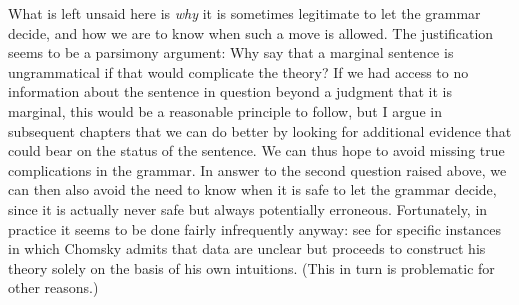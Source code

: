 \noindent
What is left unsaid here is \textit{why} it is sometimes legitimate to let the grammar decide, and how we are to know when such a move is allowed. The justification seems to be a parsimony argument: Why say that a marginal sentence is ungrammatical if that would complicate the theory? If we had access to no information about the sentence in question beyond a judgment that it is marginal, this would be a reasonable principle to follow, but I argue in subsequent chapters that we can do better by looking for additional evidence that could bear on the status of the sentence. We can thus hope to avoid missing true complications in the grammar. In answer to the second question raised above, we can then also avoid the need to know when it is safe to let the grammar decide, since it is actually never safe but
always potentially erroneous. Fortunately, in practice it seems to be done fairly infrequently anyway: see \citet{Labov1975} for specific instances in which Chomsky admits that data are unclear but proceeds to construct his theory solely on the basis of his own intuitions. (This in turn is problematic for other reasons.)

